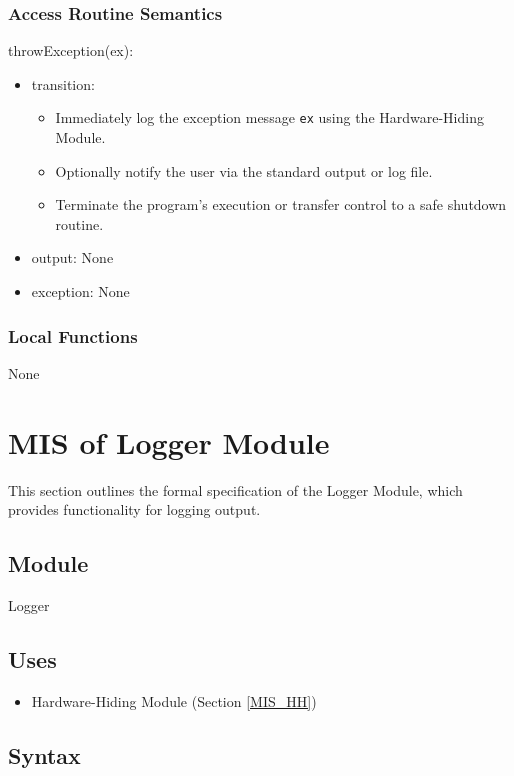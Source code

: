 \documentclass[12pt, titlepage]{article}
\begin{document}
\subsubsection{Access Routine Semantics}

\noindent throwException(ex):
\begin{itemize}
\item transition:
    \begin{itemize}
    \item Immediately log the exception message \texttt{ex} using the
    Hardware-Hiding Module.
    \item Optionally notify the user via the standard output or log file.
    \item Terminate the program’s execution or transfer control to a safe
    shutdown routine.
    \end{itemize}
\item output: None
\item exception: None
\end{itemize}

\subsubsection{Local Functions}

None


\section{MIS of Logger Module} \label{MIS_Logger}

This section outlines the formal specification of the Logger Module, which
provides functionality for logging output.

\subsection{Module}

Logger

\subsection{Uses}

\begin{itemize}
\item Hardware-Hiding Module (Section \ref{MIS_HH})
\end{itemize}

\subsection{Syntax}
\end{document}
